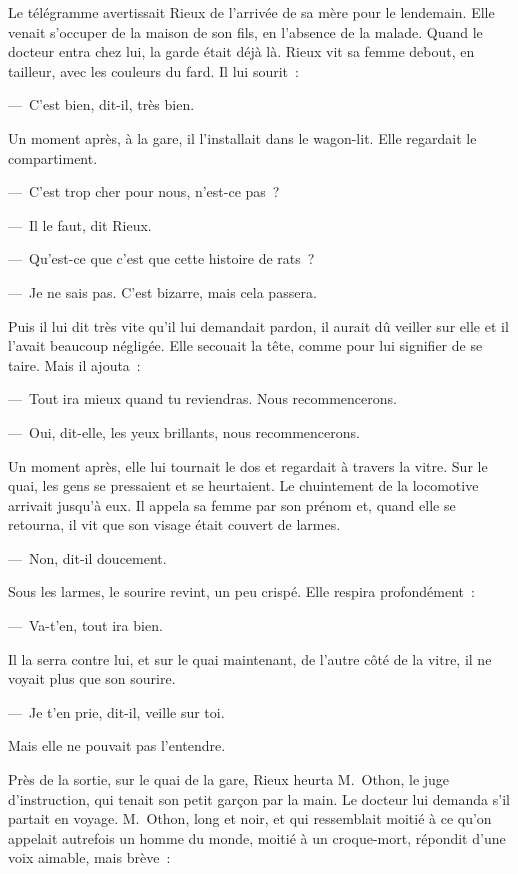 \documentclass[french,twoside]{book} %
\begin{document}
Le télégramme avertissait Rieux de l’arrivée de sa mère pour le lendemain. Elle venait s’occuper de la maison de son fils, en l’absence de la malade. Quand le docteur entra chez lui, la garde était déjà là. Rieux vit sa femme debout, en tailleur, avec les couleurs du fard. Il lui sourit :\par
— C’est bien, dit-il, très bien.\par
Un moment après, à la gare, il l’installait dans le wagon-lit. Elle regardait le compartiment.\par
— C’est trop cher pour nous, n’est-ce pas ?\par
— Il le faut, dit Rieux.\par
— Qu’est-ce que c’est que cette histoire de rats ?\par
— Je ne sais pas. C’est bizarre, mais cela passera.\par
Puis il lui dit très vite qu’il lui demandait pardon, il aurait dû veiller sur elle et il l’avait beaucoup négligée. Elle secouait la tête, comme pour lui signifier de se taire. Mais il ajouta :\par
— Tout ira mieux quand tu reviendras. Nous recommencerons.\par
— Oui, dit-elle, les yeux brillants, nous recommencerons.\par
Un moment après, elle lui tournait le dos et regardait à travers la vitre. Sur le quai, les gens se pressaient et se heurtaient. Le chuintement de la locomotive arrivait jusqu’à eux. Il appela sa femme par son prénom et, quand elle se retourna, il vit que son visage était couvert de larmes.\par
— Non, dit-il doucement.\par
Sous les larmes, le sourire revint, un peu crispé. Elle respira profondément :\par
— Va-t’en, tout ira bien.\par
Il la serra contre lui, et sur le quai maintenant, de l’autre côté de la vitre, il ne voyait plus que son sourire.\par
— Je t’en prie, dit-il, veille sur toi.\par
Mais elle ne pouvait pas l’entendre.\par
Près de la sortie, sur le quai de la gare, Rieux heurta M. Othon, le juge d’instruction, qui tenait son petit garçon par la main. Le docteur lui demanda s’il partait en voyage. M. Othon, long et noir, et qui ressemblait moitié à ce qu’on appelait autrefois un homme du monde, moitié à un croque-mort, répondit d’une voix aimable, mais brève :\par
\end{document}
